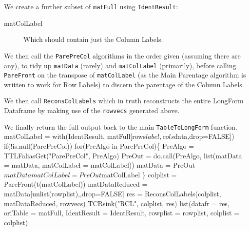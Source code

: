\documentclass[a4paper]{article}
\begin{document}
We create a further subset of \verb|matFull| using \verb|IdentResult|:
\begin{description}
\item[matColLabel] Which should contain just the Column Labels.
\end{description}

We then call the \verb|ParePreCol| algorithms in the order given
(assuming there are any), to tidy up \verb|matData| (rarely) and
\verb|matColLabel| (primarily), before calling \verb|PareFront| on the
transpose of \verb|matColLabel| (as the Main Parentage algorithm is
written to work for Row Labels) to discern the parentage of the Column
Labels.

We then call \verb|ReconsColLabels| which in truth reconstructs the
entire LongForm Dataframe by making use of the \verb|rowvecs|
generated above.

We finally return the full output back to the main
\verb|TableToLongForm| function.
\nwenddocs{}\endmoddef
matColLabel = with(IdentResult,
  matFull[rows$label, cols$data,drop=FALSE])
if(!is.null(ParePreCol))
  for(PreAlgo in ParePreCol)\{
    PreAlgo = TTLFaliasGet("ParePreCol", PreAlgo)
    PreOut = do.call(PreAlgo,
      list(matData = matData, matColLabel = matColLabel))
    matData = PreOut$matData
    matColLabel = PreOut$matColLabel
  \}
colplist = PareFront(t(matColLabel))
matDataReduced = matData[unlist(rowplist),,drop=FALSE]
res = ReconsColLabels(colplist, matDataReduced, rowvecs)
TCRsink("RCL", colplist, res)
list(datafr = res, oriTable = matFull, IdentResult = IdentResult,
     rowplist = rowplist, colplist = colplist)
\nwendcode{}\nwdocspar
\end{document}
